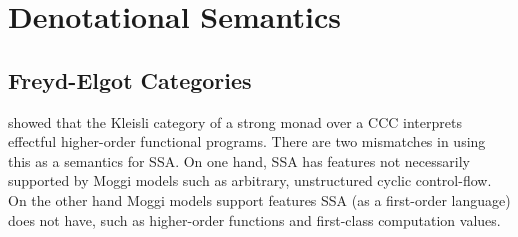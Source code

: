 \documentclass[acmsmall,screen,review]{acmart}
\begin{document}
\section{Denotational Semantics}

\label{sec:densem}

\subsection{Freyd-Elgot Categories}

\citet{moggi-91-monad} showed that the Kleisli category of a strong monad over a CCC interprets
effectful higher-order functional programs. There are two mismatches in using this as a semantics
for SSA. 
%
On one hand, SSA has features not necessarily supported by Moggi models such as arbitrary,
unstructured cyclic control-flow. 
%
On the other hand Moggi models support features SSA (as a first-order language) does not have, such
as higher-order functions and first-class computation values.
\end{document}
